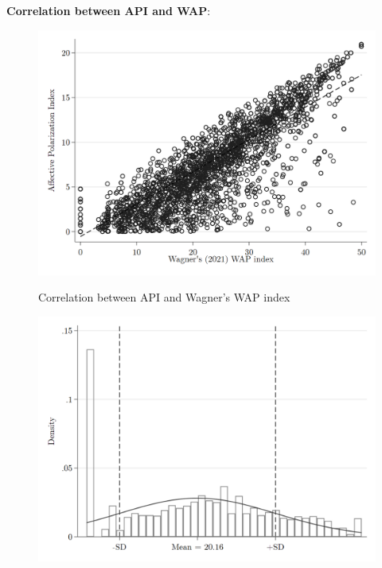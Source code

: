 \documentclass[a4paper, svgnames]{article}
\begin{document}
\textbf{Correlation between API and WAP}:

\begin{figure}[H]
	\centering
	\caption{Correlation between API and Wagner's WAP index}
	\includegraphics[width=\textwidth]{Figures/api_wagner_scatter.png}
	\label{fig:corr-api-wap}
\end{figure}

\begin{figure}[H]
	\centering
	\includegraphics[width=\textwidth]{Figures/groupsHist_wagner.png}
\end{figure}
\end{document}
